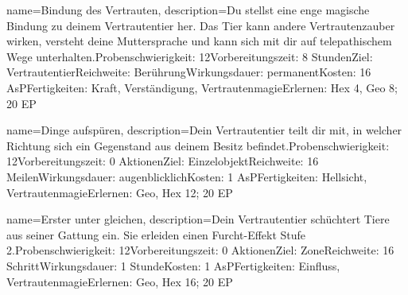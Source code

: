 {
    name={Bindung des Vertrauten},
    description={Du stellst eine enge magische Bindung zu deinem Vertrautentier her. Das Tier kann andere Vertrautenzauber wirken, versteht deine Muttersprache und kann sich mit dir auf telepathischem Wege unterhalten.\newline Probenschwierigkeit: 12\newline Vorbereitungszeit: 8 Stunden\newline Ziel: Vertrautentier\newline Reichweite: Berührung\newline Wirkungsdauer: permanent\newline Kosten: 16 AsP\newline Fertigkeiten: Kraft, Verständigung, Vertrautenmagie\newline Erlernen: Hex 4, Geo 8; 20 EP}
}


{
    name={Dinge aufspüren},
    description={Dein Vertrautentier teilt dir mit, in welcher Richtung sich ein Gegenstand aus deinem Besitz befindet.\newline Probenschwierigkeit: 12\newline Vorbereitungszeit: 0 Aktionen\newline Ziel: Einzelobjekt\newline Reichweite: 16 Meilen\newline Wirkungsdauer: augenblicklich\newline Kosten: 1 AsP\newline Fertigkeiten: Hellsicht, Vertrautenmagie\newline Erlernen: Geo, Hex 12; 20 EP}
}


{
    name={Erster unter gleichen},
    description={Dein Vertrautentier schüchtert Tiere aus seiner Gattung ein. Sie erleiden einen Furcht-Effekt Stufe 2.\newline Probenschwierigkeit: 12\newline Vorbereitungszeit: 0 Aktionen\newline Ziel: Zone\newline Reichweite: 16 Schritt\newline Wirkungsdauer: 1 Stunde\newline Kosten: 1 AsP\newline Fertigkeiten: Einfluss, Vertrautenmagie\newline Erlernen: Geo, Hex 16; 20 EP}
}


